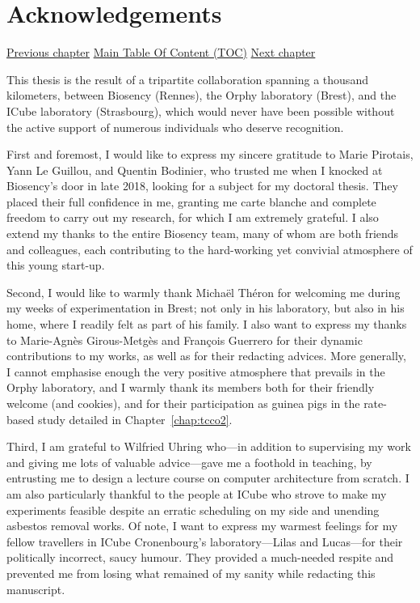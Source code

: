 \chapter{Acknowledgements}\label{forechap:ack}

\begin{tldrbox}
	\centering
	
	\tcblower
	
	\hyperref[forechap:foreword]{Previous chapter} \hfill \hyperref[chapter:toc]{Main Table Of Content (TOC)} \hfill \hyperref[chap:intro]{Next chapter}
	
\end{tldrbox}

This thesis is the result of a tripartite collaboration spanning a thousand kilometers, between Biosency (Rennes), the Orphy laboratory (Brest), and the ICube laboratory (Strasbourg), which would never have been possible without the active support of numerous individuals who deserve recognition.

First and foremost, I would like to express my sincere gratitude to Marie Pirotais, Yann Le Guillou, and Quentin Bodinier, who trusted me when I knocked at Biosency's door in late 2018, looking for a subject for my doctoral thesis. They placed their full confidence in me, granting me carte blanche and complete freedom to carry out my research, for which I am extremely grateful. I also extend my thanks to the entire Biosency team, many of whom are both friends and colleagues, each contributing to the hard-working yet convivial atmosphere of this young start-up.

Second, I would like to warmly thank Michaël Théron for welcoming me during my weeks of experimentation in Brest; not only in his laboratory, but also in his home, where I readily felt as part of his family. I also want to express my thanks to Marie-Agnès Girous-Metgès and François Guerrero for their dynamic contributions to my works, as well as for their redacting advices. More generally, I cannot emphasise enough the very positive atmosphere that prevails in the Orphy laboratory, and I warmly thank its members both for their friendly welcome (and cookies), and for their participation as guinea pigs in the rate-based study detailed in Chapter~\ref{chap:tcco2}.

Third, I am grateful to Wilfried Uhring who---in addition to supervising my work and giving me lots of valuable advice---gave me a foothold in teaching, by entrusting me to design a lecture course on computer architecture from scratch. I am also particularly thankful to the people at ICube who strove to make my experiments feasible despite an erratic scheduling on my side and unending asbestos removal works. Of note, I want to express my warmest feelings for my fellow travellers in ICube Cronenbourg's laboratory---Lilas and Lucas---for their politically incorrect, saucy humour. They provided a much-needed respite and prevented me from losing what remained of my sanity while redacting this manuscript.

